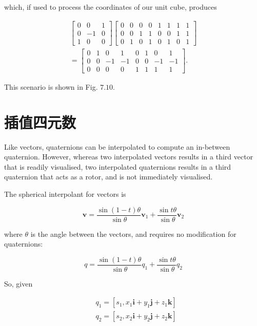 which, if used to process the coordinates of our unit cube, produces

$$
\begin{gathered}
{\left[\begin{array}{ccc}
0 & 0 & 1 \\
0 & -1 & 0 \\
1 & 0 & 0
\end{array}\right]\left[\begin{array}{cccccccc}
0 & 0 & 0 & 0 & 1 & 1 & 1 & 1 \\
0 & 0 & 1 & 1 & 0 & 0 & 1 & 1 \\
0 & 1 & 0 & 1 & 0 & 1 & 0 & 1
\end{array}\right]} \\
=\left[\begin{array}{cccccccc}
0 & 1 & 0 & 1 & 0 & 1 & 0 & 1 \\
0 & 0 & -1 & -1 & 0 & 0 & -1 & -1 \\
0 & 0 & 0 & 0 & 1 & 1 & 1 & 1
\end{array}\right] .
\end{gathered}
$$

This scenario is shown in Fig. $7.10$.

\section{插值四元数}
Like vectors, quaternions can be interpolated to compute an in-between quaternion. However, whereas two interpolated vectors results in a third vector that is readily visualised, two interpolated quaternions results in a third quaternion that acts as a rotor, and is not immediately visualised.

The spherical interpolant for vectors is

$$
\mathbf{v}=\frac{\sin (1-t) \theta}{\sin \theta} \mathbf{v}_{1}+\frac{\sin t \theta}{\sin \theta} \mathbf{v}_{2}
$$

where $\theta$ is the angle between the vectors, and requires no modification for quaternions:

$$
q=\frac{\sin (1-t) \theta}{\sin \theta} q_{1}+\frac{\sin t \theta}{\sin \theta} q_{2}
$$

So, given

$$
\begin{aligned}
& q_{1}=\left[s_{1}, x_{1} \mathbf{i}+y_{1} \mathbf{j}+z_{1} \mathbf{k}\right] \\
& q_{2}=\left[s_{2}, x_{2} \mathbf{i}+y_{2} \mathbf{j}+z_{2} \mathbf{k}\right]
\end{aligned}
$$

